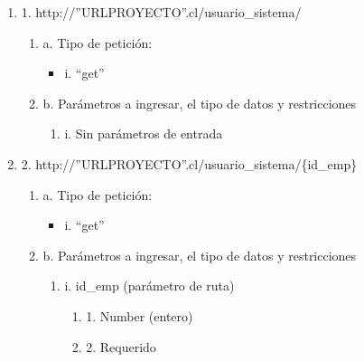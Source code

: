 \begin{enumerate}
    \item 1. http://”URLPROYECTO”.cl/usuario\_sistema/
    \begin{enumerate}
        \item a. Tipo de petición:
            \begin{itemize}
               \item i. “get”
            \end{itemize}
        \item b. Parámetros a ingresar, el tipo de datos y restricciones
            \begin{enumerate}
                \item i. Sin parámetros de entrada
            \end{enumerate}
    \end{enumerate}

    \item 2. http://”URLPROYECTO”.cl/usuario\_sistema/\{id\_emp\}
    \begin{enumerate}
        \item a. Tipo de petición:
            \begin{itemize}
               \item i. “get”
            \end{itemize}
        \item b. Parámetros a ingresar, el tipo de datos y restricciones
            \begin{enumerate}
                \item i. id\_emp (parámetro de ruta)
                    \begin{enumerate}
                        \item 1. Number (entero)
                        \item 2. Requerido
                    \end{enumerate}
            \end{enumerate}
    \end{enumerate}


\end{enumerate}
